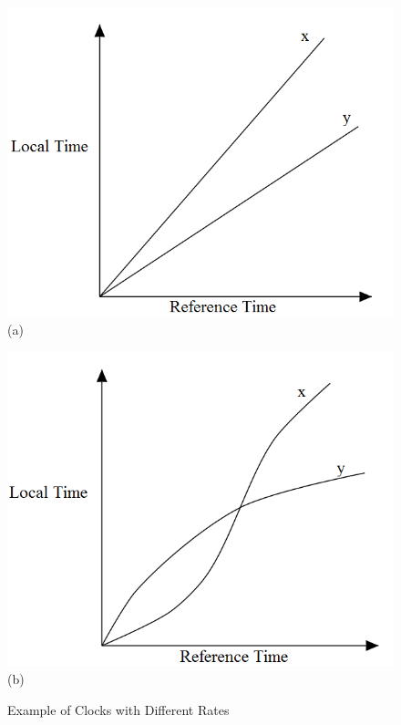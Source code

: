 \begin{figure}[ht] 
\begin{minipage}[b]{0.5\linewidth}
\centering
\includegraphics[scale=.55]{Figures/drift1}\\ 
  \vspace*{5mm} \small{(a)} 
\vspace{4ex}
\end{minipage}%
\begin{minipage}[b]{0.5\linewidth}
\centering
\includegraphics[scale=.55]{Figures/drift2}\\ 
  \vspace*{5mm} \small{(b)}
\vspace{4ex}
\end{minipage} 
\caption{Example of Clocks with Different Rates}
\label{fig:drift_exp}
\end{figure}

